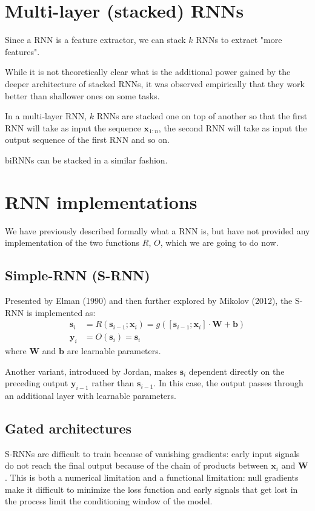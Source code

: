 \section{Multi-layer (stacked) RNNs}
Since a RNN is a feature extractor, we can stack $k$ RNNs to extract "more features".

\begin{note}{}
While it is not theoretically clear what is the additional power gained by the deeper architecture of stacked RNNs, it was observed empirically that they work better than shallower ones on some tasks.
\end{note}

In a multi-layer RNN, $k$ RNNs are stacked one on top of another so that the first RNN will take as input the sequence $\mathbf{x}_{1:n}$, the second RNN will take as input the output sequence of the first RNN and so on.

\begin{observation}{}
biRNNs can be stacked in a similar fashion.
\end{observation}

\section{RNN implementations}
We have previously described formally what a RNN is, but have not provided any implementation of the two functions $R$, $O$, which we are going to do now.

\subsection{Simple-RNN (S-RNN)}
Presented by Elman (1990) and then further explored by Mikolov (2012), the S-RNN is implemented as:
\[
\begin{aligned}
\mathbf{s}_{i}&=R(\mathbf{s}_{i-1};\mathbf{x}_{i})=g([\mathbf{s}_{i-1};\mathbf{x}_{i}]\cdot \mathbf{W} + \mathbf{b}) \\
\mathbf{y}_{i}&=O(\mathbf{s}_{i})=\mathbf{s}_{i}
\end{aligned}
\]
where $\mathbf{W}$ and $\mathbf{b}$ are learnable parameters.

Another variant, introduced by Jordan, makes $\mathbf{s}_{i}$ dependent directly on the preceding output $\mathbf{y}_{i-1}$ rather than $\mathbf{s}_{i-1}$.
In this case, the output passes through an additional layer with learnable parameters.

\subsection{Gated architectures}
S-RNNs are difficult to train because of vanishing gradients: early input signals do not reach the final output because of the chain of products between $\mathbf{x}_{i}$ and $\mathbf{W}$. This is both a numerical limitation and a functional limitation: null gradients make it difficult to minimize the loss function and early signals that get lost in the process limit the conditioning window of the model.

